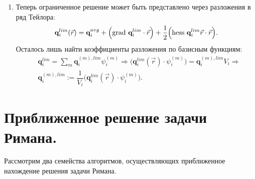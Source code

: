 \documentclass[14pt, a4paper, fleqn]{extreport}
\begin{document}
\begin{enumerate}
    \item 
    Теперь ограниченное решение может быть представлено через
    разложения в ряд Тейлора:
    \begin{equation*}
        \textbf{q}_i^{lim}(\vec{r}) 
            = \textbf{q}_i^{avg} 
            + \Big( \text{grad }{\textbf{q}}_i^{lim} \cdot \vec{r} \Big)
            + \dfrac{1}{2} \Big( \text{hess }{\textbf{q}}_i^{lim}\vec{r} \cdot \vec{r} \Big).
    \end{equation*}
    Осталось лишь найти коэффициенты разложения по базисным функциям:
    \begin{equation*}
    \begin{split}
        &\textbf{q}_i^{lim} 
            = \sum\limits_{m} \textbf{q}_i^{(m),lim} \psi_i^{(m)} \Rightarrow
                \Big( \textbf{q}_i^{lim}(\vec{r}) \cdot \psi_i^{(m)} \Big) = \textbf{q}_i^{(m),lim}V_i \Rightarrow \\
        &\textbf{q}_i^{(m),lim} 
            := \dfrac{1}{V_i}\Big( \textbf{q}_i^{lim}(\vec{r}) \cdot \psi_i^{(m)} \Big).
    \end{split}
    \end{equation*}
    
    \end{enumerate}
    

    \section{Приближенное решение задачи Римана.}
        
    Рассмотрим два семейства алгоритмов, осуществляющих
    приближенное нахождение решения задачи Римана.
    
\end{document}
